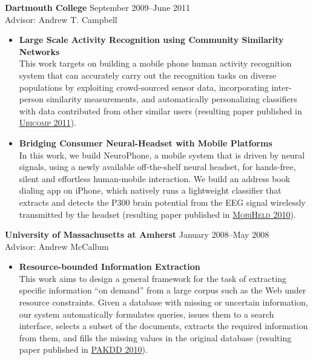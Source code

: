 {\bf Dartmouth College} \hfill September 2009--June 2011\\
Advisor: Andrew T. Campbell 
\begin{itemize}
	\item \textbf{Large Scale Activity Recognition using Community Similarity Networks} \\
	This work targets on building a mobile phone human activity recognition system that can accurately carry out the recognition tasks on diverse populations by exploiting crowd-sourced sensor data, incorporating inter-person similarity measurements, and automatically personalizing classifiers with data contributed from other similar users (resulting paper published in \hyperlink{lane2011ubicomp}{\textsc{Ubicomp 2011}}).
	
	\item \textbf{Bridging Consumer Neural-Headset with Mobile Platforms} \\
	In this work, we build NeuroPhone, a mobile system that is driven by neural signals, using a newly available off-the-shelf neural headset, for hands-free, silent and effortless human-mobile interaction. We build an address book dialing app on iPhone, which natively runs a lightweight classifier that extracts and detects the P300 brain potential from the EEG signal wirelessly transmitted by the headset (resulting paper published in \hyperlink{campbell2010mobiheld}{\textsc{MobiHeld 2010}}). 
\end{itemize}

{\bf University of Massachusetts at Amherst} \hfill January 2008--May 2008 \\
Advisor: Andrew McCallum 
\begin{itemize}
	\item \textbf{Resource-bounded Information Extraction} \\
	This work aims to design a general framework for the task of extracting specific information ``on demand'' from a large corpus such as the Web under resource constraints. Given a database with missing or uncertain information, our system automatically formulates queries, issues them to a search interface, selects a subset of the documents, extracts the required information from them, and fills the missing values in the original database (resulting paper published in \hyperlink{kanani2010pakdd}{\textsc{PAKDD 2010}}). 
\end{itemize}
